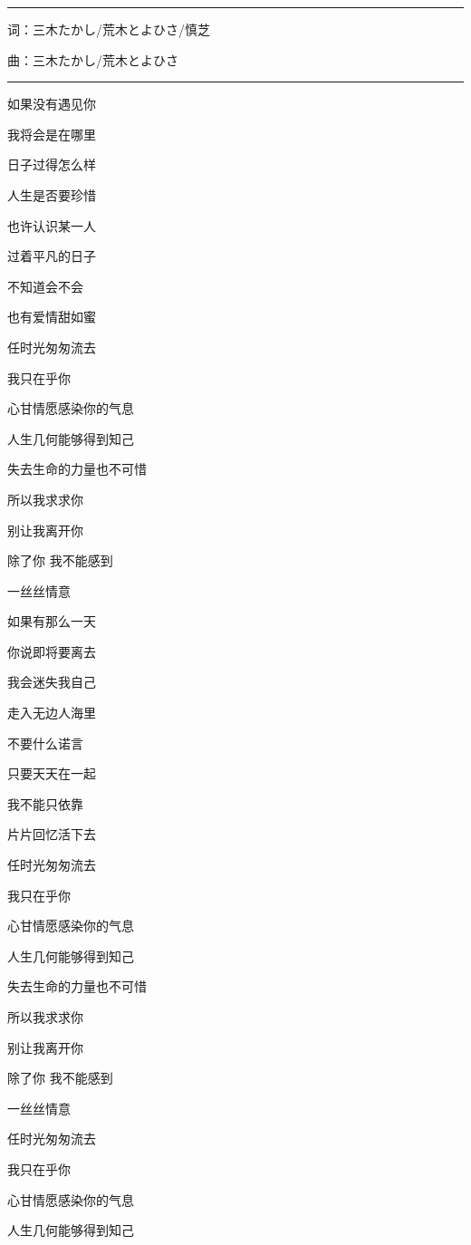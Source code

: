 \documentclass[]{ctexbook}
\begin{document}
\begin{center}\rule{0.5\linewidth}{0.5pt}\end{center}

词：三木たかし/荒木とよひさ/慎芝

曲：三木たかし/荒木とよひさ

\begin{center}\rule{0.5\linewidth}{0.5pt}\end{center}

如果没有遇见你

我将会是在哪里

日子过得怎么样

人生是否要珍惜

也许认识某一人

过着平凡的日子

不知道会不会

也有爱情甜如蜜

任时光匆匆流去

我只在乎你

心甘情愿感染你的气息

人生几何能够得到知己

失去生命的力量也不可惜

所以我求求你

别让我离开你

除了你 我不能感到

一丝丝情意

如果有那么一天

你说即将要离去

我会迷失我自己

走入无边人海里

不要什么诺言

只要天天在一起

我不能只依靠

片片回忆活下去

任时光匆匆流去

我只在乎你

心甘情愿感染你的气息

人生几何能够得到知己

失去生命的力量也不可惜

所以我求求你

别让我离开你

除了你 我不能感到

一丝丝情意

任时光匆匆流去

我只在乎你

心甘情愿感染你的气息

人生几何能够得到知己
\end{document}
